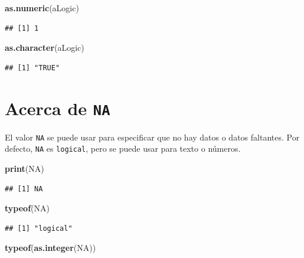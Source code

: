 \documentclass[
]{book}
\newenvironment{Shaded}{\begin{snugshade}}{\end{snugshade}}
\newcommand{\KeywordTok}[1]{\textcolor[rgb]{0.13,0.29,0.53}{\textbf{#1}}}
\newcommand{\NormalTok}[1]{#1}
\newcommand{\OtherTok}[1]{\textcolor[rgb]{0.56,0.35,0.01}{#1}}
\begin{document}
\begin{Shaded}
\begin{Highlighting}[]
\KeywordTok{as.numeric}\NormalTok{(aLogic)}
\end{Highlighting}
\end{Shaded}

\begin{verbatim}
## [1] 1
\end{verbatim}

\begin{Shaded}
\begin{Highlighting}[]
\KeywordTok{as.character}\NormalTok{(aLogic)}
\end{Highlighting}
\end{Shaded}

\begin{verbatim}
## [1] "TRUE"
\end{verbatim}

\hypertarget{acerca-de-na}{%
\section{\texorpdfstring{Acerca de \texttt{NA}}{Acerca de NA}}\label{acerca-de-na}}

El valor \texttt{NA} se puede usar para especificar que no hay datos o datos faltantes. Por defecto, \texttt{NA} es \texttt{logical}, pero se puede usar para texto o números.

\begin{Shaded}
\begin{Highlighting}[]
\KeywordTok{print}\NormalTok{(}\OtherTok{NA}\NormalTok{)}
\end{Highlighting}
\end{Shaded}

\begin{verbatim}
## [1] NA
\end{verbatim}

\begin{Shaded}
\begin{Highlighting}[]
\KeywordTok{typeof}\NormalTok{(}\OtherTok{NA}\NormalTok{)}
\end{Highlighting}
\end{Shaded}

\begin{verbatim}
## [1] "logical"
\end{verbatim}

\begin{Shaded}
\begin{Highlighting}[]
\KeywordTok{typeof}\NormalTok{(}\KeywordTok{as.integer}\NormalTok{(}\OtherTok{NA}\NormalTok{))}
\end{Highlighting}
\end{Shaded}
\end{document}
